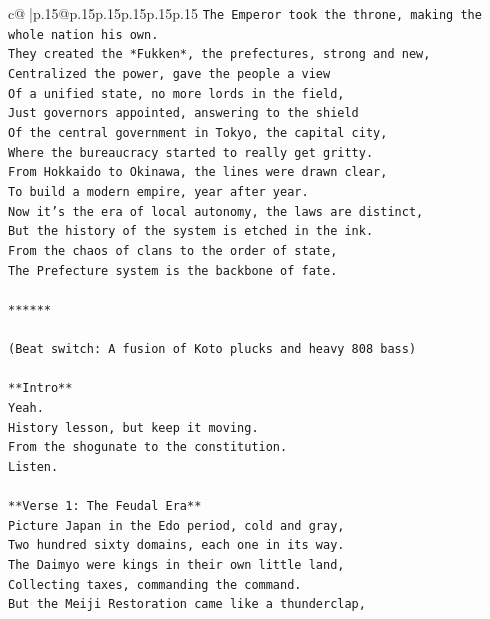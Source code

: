 \documentclass{article}
\begin{document}
{\begin{supertabular}{c@{$\;$}|p{.15\linewidth}@{}p{.15\linewidth}p{.15\linewidth}p{.15\linewidth}p{.15\linewidth}p{.15\linewidth}}
{{{\texttt{The Emperor took the throne, making the whole nation his own.} \\
\texttt{They created the *Fukken*, the prefectures, strong and new,} \\
\texttt{Centralized the power, gave the people a view} \\
\texttt{Of a unified state, no more lords in the field,} \\
\texttt{Just governors appointed, answering to the shield} \\
\texttt{Of the central government in Tokyo, the capital city,} \\
\texttt{Where the bureaucracy started to really get gritty.} \\
\texttt{From Hokkaido to Okinawa, the lines were drawn clear,} \\
\texttt{To build a modern empire, year after year.} \\
\texttt{Now it's the era of local autonomy, the laws are distinct,} \\
\texttt{But the history of the system is etched in the ink.} \\
\texttt{From the chaos of clans to the order of state,} \\
\texttt{The Prefecture system is the backbone of fate.} \\
\\ 
\texttt{******} \\
\\ 
\texttt{(Beat switch: A fusion of Koto plucks and heavy 808 bass)} \\
\\ 
\texttt{**Intro**} \\
\texttt{Yeah.} \\
\texttt{History lesson, but keep it moving.} \\
\texttt{From the shogunate to the constitution.} \\
\texttt{Listen.} \\
\\ 
\texttt{**Verse 1: The Feudal Era**} \\
\texttt{Picture Japan in the Edo period, cold and gray,} \\
\texttt{Two hundred sixty domains, each one in its way.} \\
\texttt{The Daimyo were kings in their own little land,} \\
\texttt{Collecting taxes, commanding the command.} \\
\texttt{But the Meiji Restoration came like a thunderclap,} \\
}}}
\end{supertabular}}
\end{document}
